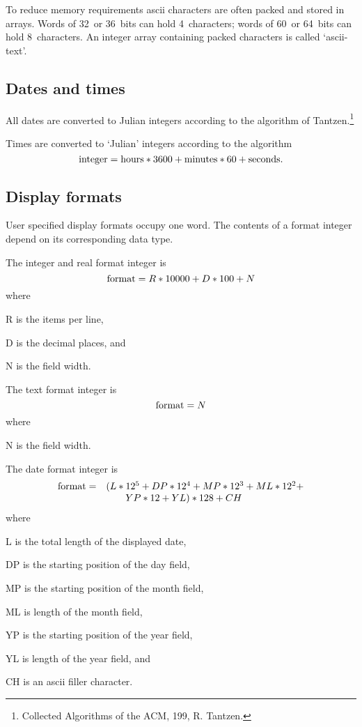 \documentclass[11pt,a4paper]{report}
\begin{document}
To reduce memory requirements ascii characters are often
packed and stored in arrays.  Words of 32~or 36~bits
can hold 4~characters;  words of 60~or 64~bits
can hold 8~characters.  An integer array containing
packed characters is called `ascii-text'.
 
\subsection{Dates and times}
 
All dates are converted to Julian integers according to
the algorithm of Tantzen.\footnote{Collected Algorithms
of the ACM, 199, R. Tantzen.}
 
 
Times are converted to `Julian' integers according to
the algorithm
    \[\hbox{integer} = \hbox{hours}*3600 + \hbox{minutes}*60 +
     \hbox{seconds}.\]
 
\subsection{Display formats}
%
User specified display formats occupy one word.  The contents
of a format integer depend on its corresponding data type.
 
The integer and real format integer is
  \[\hbox{format}
      = R*10000 + D*100 + N\]
where
 
  \begin{List}
  \item[R] is the items per line,
  \item[D] is the decimal places, and
  \item[N] is the field width.
  \end{List}
 
The text format integer is
  \[\hbox{format}
      = N\]
where
 
  \begin{List}
  \item[N] is the field width.
  \end{List}
 
The date format integer is
  \[\begin{array}{rl}
    \hbox{format}
      = & (L*12^5 + DP*12^4 + MP*12^3 + ML*12^2 + \\
        & \qquad YP*12 + YL)*128+CH\end{array}\]
where
 
  \begin{List}
  \item[L] is the total length of the displayed date,
  \item[DP] is the starting position of the day field,
  \item[MP] is the starting position of the month field,
  \item[ML] is length of the month field,
  \item[YP] is the starting position of the year field,
  \item[YL] is length of the year field, and
  \item[CH] is an ascii filler character.
  \end{List}
 
\end{document}
